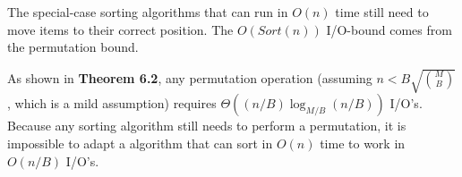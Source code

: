 The special-case sorting algorithms that can run in $O(n)$ time still need to move items to their correct position.
The $O(Sort(n))$ I/O-bound comes from the permutation bound.

As shown in \textbf{Theorem 6.2}, any permutation operation (assuming $n < B\sqrt{{M \choose B}}$, which is a mild assumption) requires $\Theta((n/B)\log_{M/B}{(n/B)})$ I/O's.
Because any sorting algorithm still needs to perform a permutation, it is impossible to adapt a algorithm that can sort in $O(n)$ time to work in $O(n/B)$ I/O's.
